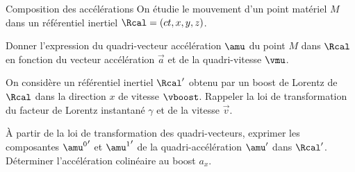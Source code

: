 \begin{exo}[PC][3][TD]{Composition des accélérations}
  On étudie le mouvement d'un point matériel $M$ dans un référentiel inertiel $\Rcal=(ct,x,y,z)$.
  \begin{quest}
    \item	Donner l'expression du quadri-vecteur accélération $\amu$ du point $M$ dans $\Rcal$ en fonction du vecteur accélération $\Vec{a}$ et de la quadri-vitesse $\vmu$.
    \item On considère un référentiel inertiel $\Rcal'$ obtenu par un boost de Lorentz de $\Rcal$ dans la direction $x$ de vitesse $\vboost$. Rappeler la loi de transformation du facteur de Lorentz instantané $\gamma$ et de la vitesse $\Vec{v}$.
    \item 
    À partir de la loi de transformation des quadri-vecteurs, exprimer les composantes ${\amu^0}'$ et ${\amu^1}'$ de la quadri-accélération $\amu'$ dans $\Rcal'$. Déterminer l'accélération colinéaire au boost $a_x$.
\end{quest}
\end{exo}

